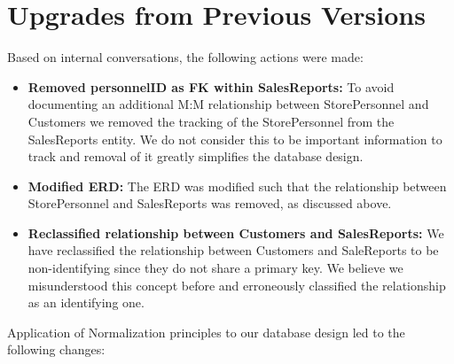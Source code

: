 \documentclass{article}
\begin{document}
\section{Upgrades from Previous Versions}

\begin{tcolorbox}[colback=secondarycolor, colframe=primarycolor, arc=5mm, title=\textbf{Step 1 --> Step 2}]
Based on internal conversations, the following actions were made:
\vspace{0.2cm}
\begin{itemize}
  \item \textbf{Removed personnelID as FK within SalesReports:} To avoid documenting an additional M:M relationship between StorePersonnel and Customers we removed the tracking of the StorePersonnel from the SalesReports entity. We do not consider this to be important information to track and removal of it greatly simplifies the database design.
  \vspace{0.1cm}
  \item \textbf{Modified ERD:} The ERD was modified such that the relationship between StorePersonnel and SalesReports was removed, as discussed above.
  \vspace{0.1cm}
  \item \textbf{Reclassified relationship between Customers and SalesReports:} We have reclassified the relationship between Customers and SaleReports to be non-identifying since they do not share a primary key. We believe we misunderstood this concept before and erroneously classified the relationship as an identifying one.
  \end{itemize}
\vspace{0.2cm}

Application of Normalization principles to our database design led to the following changes:


\end{tcolorbox}
\end{document}
